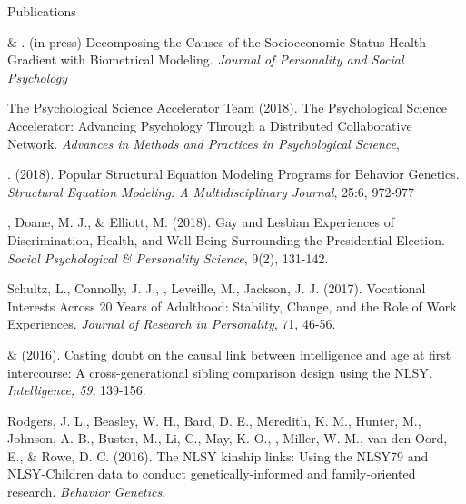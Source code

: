 \begin{rSection}{\textrm{Publications}}%
\begin{etaremune}
\item \meb \& \joe.  (in press) Decomposing the Causes of the Socioeconomic Status-Health Gradient with Biometrical Modeling. \textit{Journal of Personality and Social Psychology} \href{https://osf.io/vd2kc/}{\color{blue}{https://osf.io/vd2kc/}}
\item The Psychological Science Accelerator Team (2018). The Psychological Science Accelerator: Advancing Psychology Through a Distributed Collaborative Network. \textit{Advances in Methods and Practices in Psychological Science}, \href{https://psyarxiv.com/785qu/}{\color{blue}{https://psyarxiv.com/785qu/}}
\item \meb. (2018). Popular Structural Equation Modeling Programs for Behavior Genetics. \textit{Structural Equation Modeling: A Multidisciplinary Journal}, 25:6, 972-977 \href{}{\color{blue}{doi:10.1080/10705511.2018.1493385}}
\item\meb, Doane, M. J., \& Elliott, M. (2018). Gay and Lesbian Experiences of Discrimination, Health, and Well-Being Surrounding the Presidential Election. \textit{Social Psychological \& Personality Science}, 9(2), 131-142. \href{https://dx.doi.org/10.17605/OSF.IO/DWSCM}{\color{blue}{https://osf.io/dwscm/}}
\item Schultz, L., Connolly, J. J., \meb, Leveille, M., Jackson, J. J. (2017). Vocational Interests Across 20 Years of Adulthood: Stability, Change, and the Role of Work Experiences. \textit{Journal of Research in Personality}, 71, 46-56.
\item\meb \& \Joe (2016). Casting doubt on the causal link between intelligence and age at first intercourse: A cross-generational sibling comparison design using the NLSY. \textit{Intelligence, 59}, 139-156. \href{http://www.sciencedirect.com/science/article/pii/S0160289616300162}{\color{blue}{doi:10.1016/j.intell.2016.08.008}}
\item Rodgers, J. L., Beasley, W. H., Bard, D. E., Meredith, K. M., Hunter, M., Johnson, A. B., Buster, M., Li, C., May, K. O., \meb, Miller, W. M., van den Oord, E., \& Rowe, D. C. (2016). The NLSY kinship links: Using the NLSY79 and NLSY-Children data to conduct genetically-informed and family-oriented research. \textit{Behavior Genetics}. \href{http://dx.doi.org/10.1007/s10519-016-9785-3}{\color{blue}{doi:10.1007/s10519-016-9785-3}}

\end{etaremune}
\end{rSection}
